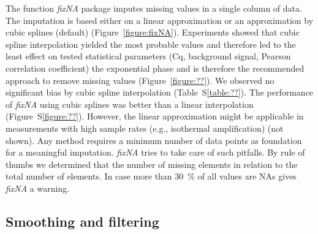\documentclass[twocolumn]{bmcart}%
\begin{document}
  The function \textsl{fixNA} package imputes missing values in a single column 
of data. The imputation is based either on a linear approximation or an 
approximation by cubic splines (default) (Figure~\ref{figure:fixNA}). 
Experiments showed that cubic spline interpolation yielded the most probable 
values and therefore led to the least effect on tested statistical parameters 
(Cq, background signal, Pearson correlation coefficient) the exponential phase 
and is therefore the recommended approach to remove missing values 
(Figure~\ref{figure:??}). We observed no significant bias by cubic spline 
interpolation (Table~S\ref{table:??}). The performance of \textsl{fixNA} using 
cubic splines was better than a linear interpolation (Figure~S\ref{figure:??}). 
However, the linear approximation might be applicable in measurements with high 
sample rates (e.g., isothermal amplification) (not shown). Any method requires a 
minimum number of data points as foundation for a meaningful imputation. 
\textsl{fixNA} tries to take care of such pitfalls. By rule of thumbs we 
determined that the number of missing elements in relation to the total number 
of elements. In case more than 30~\% of all values are NAs gives \textsl{fixNA} 
a warning.

\subsection*{Smoothing and filtering}
\end{document}

